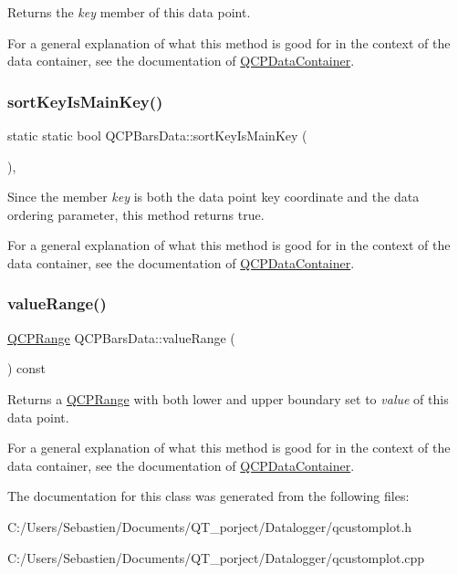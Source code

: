 Returns the {\itshape key} member of this data point.

For a general explanation of what this method is good for in the context of the data container, see the documentation of \hyperlink{class_q_c_p_data_container}{Q\+C\+P\+Data\+Container}. \mbox{\label{class_q_c_p_bars_data_aebaabda335bd4c9f81bd585d16b63aa8}} 
\subsubsection{\texorpdfstring{sort\+Key\+Is\+Main\+Key()}{sortKeyIsMainKey()}}
{\footnotesize\ttfamily static static bool Q\+C\+P\+Bars\+Data\+::sort\+Key\+Is\+Main\+Key (\begin{DoxyParamCaption}{ }\end{DoxyParamCaption})\hspace{0.3cm}{\ttfamily [inline]}, {\ttfamily [static]}}

Since the member {\itshape key} is both the data point key coordinate and the data ordering parameter, this method returns true.

For a general explanation of what this method is good for in the context of the data container, see the documentation of \hyperlink{class_q_c_p_data_container}{Q\+C\+P\+Data\+Container}. \mbox{\label{class_q_c_p_bars_data_acf3e6479dacacd6c81eebe7d4cd62185}} 
\subsubsection{\texorpdfstring{value\+Range()}{valueRange()}}
{\footnotesize\ttfamily \hyperlink{class_q_c_p_range}{Q\+C\+P\+Range} Q\+C\+P\+Bars\+Data\+::value\+Range (\begin{DoxyParamCaption}{ }\end{DoxyParamCaption}) const\hspace{0.3cm}{\ttfamily [inline]}}

Returns a \hyperlink{class_q_c_p_range}{Q\+C\+P\+Range} with both lower and upper boundary set to {\itshape value} of this data point.

For a general explanation of what this method is good for in the context of the data container, see the documentation of \hyperlink{class_q_c_p_data_container}{Q\+C\+P\+Data\+Container}. 

The documentation for this class was generated from the following files\+:\begin{DoxyCompactItemize}
\item 
C\+:/\+Users/\+Sebastien/\+Documents/\+Q\+T\+\_\+porject/\+Datalogger/qcustomplot.\+h\item 
C\+:/\+Users/\+Sebastien/\+Documents/\+Q\+T\+\_\+porject/\+Datalogger/qcustomplot.\+cpp\end{DoxyCompactItemize}
